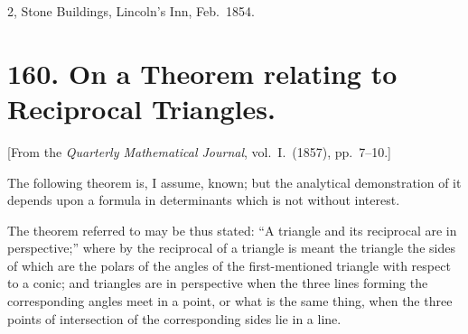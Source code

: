 \documentclass[11pt,a4paper]{book}
\begin{document}
\begin{flushright}
2, Stone Buildings, Lincoln's Inn, Feb.~1854.
\end{flushright}

\clearpage

\section*{160. On a Theorem relating to Reciprocal Triangles.}

[From the \textit{Quarterly Mathematical Journal}, vol.~I.\ (1857), pp.~7--10.]

The following theorem is, I assume, known; but the analytical demonstration of it depends upon a formula in determinants which is not without interest.

The theorem referred to may be thus stated: ``A triangle and its reciprocal are in perspective;'' where by the reciprocal of a triangle is meant the triangle the sides of which are the polars of the angles of the first-mentioned triangle with respect to a conic; and triangles are in perspective when the three lines forming the corresponding angles meet in a point, or what is the same thing, when the three points of intersection of the corresponding sides lie in a line.
\end{document}
